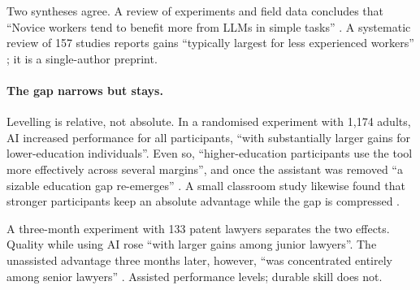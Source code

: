 Two syntheses agree. A review of experiments and field data concludes
that \enquote{Novice workers tend to benefit more from LLMs in simple
tasks} \autocite{DelRioChanona2025AI}. A systematic review of 157
studies reports gains \enquote{typically largest for less experienced
workers} \autocite{Khandare2026Short}; it is a single-author preprint.

\paragraph{The gap narrows but stays.}
Levelling is relative, not absolute. In a randomised experiment with
1,174 adults, AI increased performance for all participants,
\enquote{with substantially larger gains for lower-education
individuals}. Even so, \enquote{higher-education participants use the
tool more effectively across several margins}, and once the assistant
was removed \enquote{a sizable education gap re-emerges}
\autocite{Cruces2026Does}. A small classroom study likewise found that
stronger participants keep an absolute advantage while the gap is
compressed \autocite{Bierbrauer2026Is}.

A three-month experiment with 133 patent lawyers separates the two
effects. Quality while using AI rose \enquote{with larger gains among
junior lawyers}. The unassisted advantage three months later, however,
\enquote{was concentrated entirely among senior lawyers}
\autocite{Autor2026Does}. Assisted performance levels; durable skill
does not.

